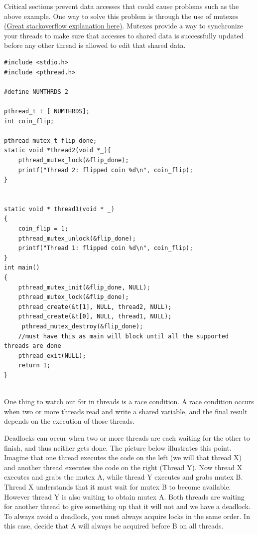 Critical sections prevent data accesses that could cause problems such as the above example.  One way to solve this problem is through the use of mutexes \href{http://stackoverflow.com/questions/34524/what-is-a-mutex
}{(Great stackoverflow explanation here)}.  Mutexes provide a way to synchronize your threads to make sure that accesses to shared data is successfully updated before any other thread is allowed to edit that shared data.


\begin{lstlisting}
#include <stdio.h>
#include <pthread.h>

#define NUMTHRDS 2

pthread_t t [ NUMTHRDS];
int coin_flip;

pthread_mutex_t flip_done;
static void *thread2(void *_){
	pthread_mutex_lock(&flip_done);
	printf("Thread 2: flipped coin %d\n", coin_flip);
}


static void * thread1(void * _)
{
	coin_flip = 1;
	pthread_mutex_unlock(&flip_done);
	printf("Thread 1: flipped coin %d\n", coin_flip);
}
int main()
{
	pthread_mutex_init(&flip_done, NULL);
	pthread_mutex_lock(&flip_done);
	pthread_create(&t[1], NULL, thread2, NULL);
	pthread_create(&t[0], NULL, thread1, NULL);
	 pthread_mutex_destroy(&flip_done);
	//must have this as main will block until all the supported threads are done
	pthread_exit(NULL);
	return 1;
}


\end{lstlisting}


One thing to watch out for in threads is a race condition.  A race condition occurs when two or more threads read and write a shared variable, and the final result depends on the execution of those threads.


Deadlocks can occur when two or more threads are each waiting for the other to finish, and thus neither gets done.  The picture below illustrates this point.  Imagine that one thread executes the code on the left (we will that thread X) and another thread executes the code on the right (Thread Y).  Now thread X executes and grabs the mutex A, while thread Y executes and grabs mutex B.  Thread X understands that it must wait for  mutex B to become available.  However thread Y is also waiting to obtain mutex A.  Both threads are waiting for another thread to give something up that it will not and we have a deadlock.  To always avoid a deadlock, you must always acquire locks in the same order.  In this case, decide that A will always be acquired before B on all threads.

